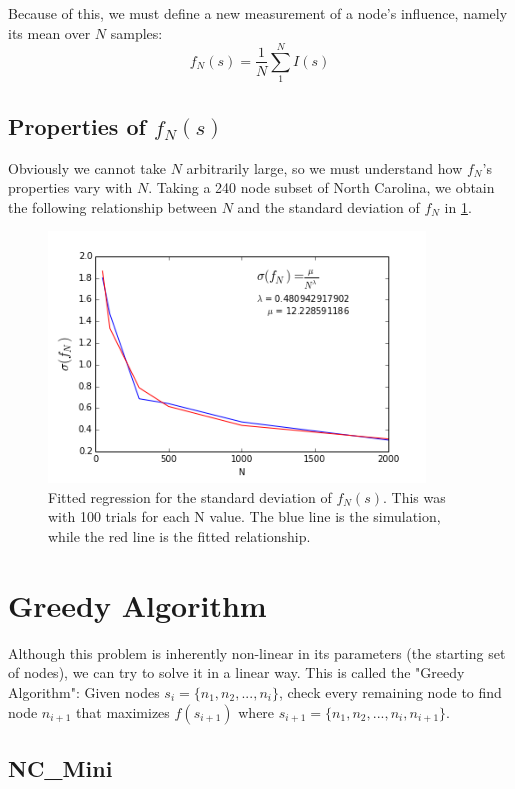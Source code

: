 \documentclass{article}
\begin{document}
	Because of this, we must define a new measurement of a node's influence, namely its mean over $N$ samples:
		\begin{equation}
		\boxed{
			f_N(s) = \frac{1}{N}\sum_1^N I(s)
		}
		\end{equation}
		
		
		
	\subsection{Properties of $f_N(s)$}
	Obviously we cannot take $N$ arbitrarily large, so we must understand how $f_N$'s properties vary with $N$. Taking a 240 node subset of North Carolina, we obtain the following relationship between $N$ and the standard deviation of $f_N$ in \ref{fig:lambda}.
	
		\begin{figure}[h!]
			\centering
			\includegraphics[width=100mm]{lambda_regression.png}
			\caption{Fitted regression for the standard deviation of $f_N(s)$. This was with 100 trials for each N value. The blue line is the simulation, while the red line is the fitted relationship.}
			\label{fig:lambda}
		\end{figure}
			
	
	\section{Greedy Algorithm}
		Although this problem is inherently non-linear in its parameters (the starting set of nodes), we can try to solve it in a linear way. This is called the "Greedy Algorithm":
		Given nodes $s_i = \{n_1, n_2,..., n_i\}$, check every remaining node to find node ${n_{i+1}}$ that maximizes $f(s_{i+1})$ where $s_{i+1} =  \{n_1, n_2, ..., n_i, n_{i+1}\}$.

	\subsection{NC\_Mini}
\end{document}
